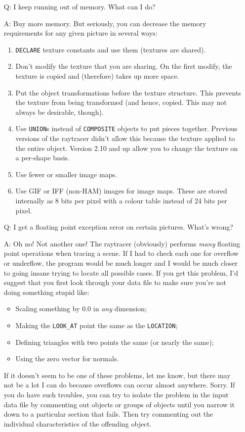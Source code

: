 \begin{itemize}
\item[Q:] I keep running out of memory.  What can I do?
\item[A:] Buy more memory.  But seriously, you can decrease the memory
requirements for any given picture in several ways:
\begin{enumerate}
\item {\tt DECLARE} texture constants and use them
(textures are shared).
\item Don't modify the texture that you are sharing.  On the first
modify, the texture is copied and (therefore) takes up more space.
\item Put the object transformations before the texture structure.  This
prevents the texture from being transformed (and hence, copied.
This may not always be desirable, though).
\item Use {\tt UNION}s instead of
{\tt COMPOSITE} objects to put
pieces together. Previous versions of the raytracer didn't allow
this because the texture applied to the entire object.  Version 2.10
and up allow you to change the texture on a per-shape basis.
\item Use fewer or smaller image maps.
\item Use GIF or IFF (non-HAM) images for image
maps.  These are stored internally as 8 bits per pixel with a colour
table instead of 24 bits per pixel.
\end{enumerate}

\item[Q:] I get a floating point exception error on
certain pictures. What's wrong?
\item[A:] Oh no! Not another one!  The raytracer (obviously) performs
{\em many} floating point operations when tracing a scene.  If I had to check
each one for overflow or underflow, the program would be much longer
and I would be much closer to going insane trying to locate all
possible cases.  If you get this problem, I'd suggest that you
first look through your data file to make sure you're not doing
something stupid like:
\begin{itemize}
\item Scaling something by 0.0 in {\em any} dimension;
\item Making the {\tt LOOK_AT} point the same as
the {\tt LOCATION};
\item Defining triangles with two
points the same (or nearly the same);
\item Using the zero vector for normals.
\end{itemize}
If it doesn't seem to be one of these problems, let me know, but there
may not be a lot I can do because overflows can occur almost anywhere.
Sorry.  If you do have such troubles, you can try to isolate the
problem in the input data file by commenting out objects or groups
of objects until you narrow it down to a particular section that
fails.  Then try commenting out the individual characteristics of the
offending object.


\end{itemize}
